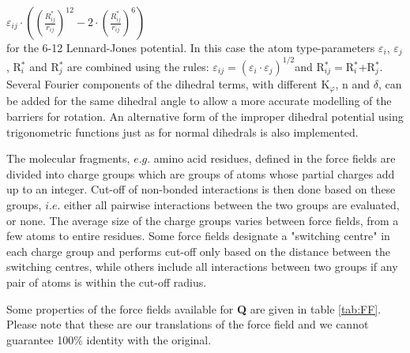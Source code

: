 \documentclass[a4paper,10pt]{article}
\begin{document}
$\varepsilon_{ij} \cdot \left( {\left( {\frac{R_{ij}^\ast
}{r_{ij}}} \right)^{12}-2\cdot \left( {\frac{R_{ij}^\ast
}{r_{ij}}} \right)^6} \right)$\\

for the 6-12 Lennard-Jones potential. In this case the atom
type-parameters $\varepsilon _{i}$, $\varepsilon _{j}$,
R$^{\ast}_{i}$ and R$^{\ast }_{j}$ are combined using the rules:
$\varepsilon _{ij}=(\varepsilon _{i}\cdot \varepsilon
_{j})^{1/2}$and R$^{\ast}_{ij} = $R$^{\ast}_{i}$+R$^{\ast}_{j}$.
Several Fourier components of the dihedral terms, with different
K$_{\varphi }$, n and $\delta $, can be added for the same
dihedral angle to allow a more accurate modelling of the barriers
for rotation. An alternative form of the improper dihedral
potential using trigonometric functions just as for normal
dihedrals is also implemented.

The molecular  fragments, $e.g.$ amino  acid residues, defined  in the
force fields are divided into charge  groups which are groups of atoms
whose  partial charges  add up  to an  integer. Cut-off  of non-bonded
interactions is  then done  based on these  groups, $i.e.$  either all
pairwise  interactions  between  the  two  groups  are  evaluated,  or
none.  The average  size of  the  charge groups  varies between  force
fields,  from  a few  atoms  to  entire  residues. Some  force  fields
designate  a "switching  centre"  in each  charge  group and  performs
cut-off  only based  on the  distance between  the switching  centres,
while others include  all interactions between two groups  if any pair
of atoms is within the cut-off radius.

Some properties of the force fields available for \textbf{Q} are given in table
\ref{tab:FF}. Please note that these are our translations of the force
field and we cannot guarantee 100\% identity with the original.
\end{document}

